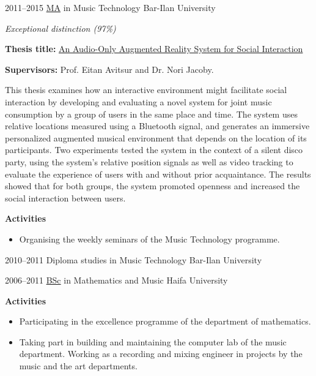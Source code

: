 \documentclass[]{friggeri-cv}
\begin{document}
\begin{entrylist}

    \entry
    {2011--2015}
    {\href{http://www.tomgurion.me/pdfs/MA.pdf}{MA} in Music Technology}
    {Bar-Ilan University}
    {
      \textit{Exceptional distinction (97\%)}

      \textbf{Thesis title:} \href{http://www.tomgurion.me/pdfs/Gurion - An Audio-Only Augmented Reality System for Social Interaction.pdf}{An Audio-Only Augmented Reality System for Social Interaction}

      \textbf{Supervisors:} Prof. Eitan Avitsur and Dr. Nori Jacoby.

      This thesis examines how an interactive environment might facilitate social interaction by developing and evaluating a novel system for joint music consumption by a group of users in the same place and time.
      The system uses relative locations measured using a Bluetooth signal, and generates an immersive personalized augmented musical environment that depends on the location of its participants.
      Two experiments tested the system in the context of a silent disco party, using the system's relative position signals as well as video tracking to evaluate the experience of users with and without prior acquaintance.
      The results showed that for both groups, the system promoted openness and increased the social interaction between users.

      \textbf{Activities}
      \begin{itemize}
        \item
          Organising the weekly seminars of the Music Technology programme.
      \end{itemize}
    }

\end{entrylist}
\begin{entrylist}

    \entry
    {2010--2011}
    {Diploma studies in Music Technology}
    {Bar-Ilan University}

\end{entrylist}
\begin{entrylist}

    \entry
    {2006--2011}
    {\href{http://www.tomgurion.me/pdfs/BSc.pdf}{BSc} in Mathematics and Music}
    {Haifa University}
    {
      \textbf{Activities}
      \begin{itemize}
        \item
          Participating in the excellence programme of the department of mathematics.
        \item
          Taking part in building and maintaining the computer lab of the music department.
          Working as a recording and mixing engineer in projects by the music and the art departments.
      \end{itemize}
    }

\end{entrylist}
\end{document}
